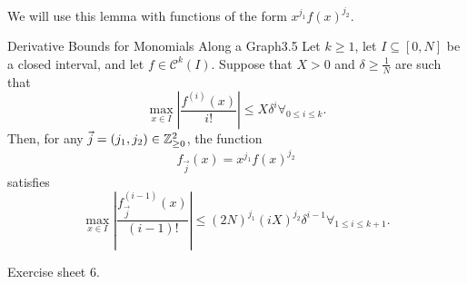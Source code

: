 \documentclass{Vorlesungstemplate_English} %
\begin{document}
\noindent We will use this lemma with functions of the form $x^{j_1}f(x)^{j_2}$.
\begin{lemma}{Derivative Bounds for Monomials Along a Graph}{3.5}
  Let $k \geq 1$, let $I \subseteq [0,N]$ be a closed interval, and let $f \in \mathcal{C}^k(I)$. Suppose that $X > 0$ and $\delta \geq \frac{1}{N}$ are such that
  \[ \max_{x \in I}\left| \frac{f^{(i)}(x)}{i!}\right| \leq X\delta^i \forall_{0 \leq i \leq k}.\]
  Then, for any $\vec j=(j_1,j_2) \in \mathbb{Z}_{\geq 0}^2$, the function
  \[ f_{\vec j}(x)=x^{j_1}f(x)^{j_2}\]
  satisfies
  \[ \max_{x \in I}\left|\frac{f_{\vec j}^{(i-1)}(x)}{(i-1)!}\right| \leq (2N)^{j_1}(iX)^{j_2}\delta^{i-1} \forall_{1 \leq i \leq k+1}.\]
\end{lemma}
\begin{pf}
  Exercise sheet 6.
\end{pf}
\end{document}
